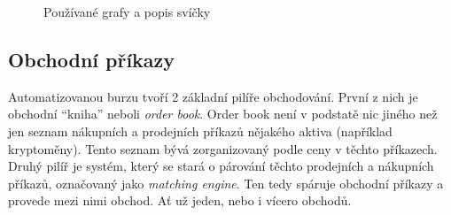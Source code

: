 \begin{figure}[ht]
    \centering
    \qquad

    \qquad

    \caption{Používané grafy a popis svíčky}
    \label{fig:most-used-charts}
\end{figure}


\subsection{Obchodní příkazy}
\label{subsec:market-trade-orders}
Automatizovanou burzu tvoří 2 základní pilíře obchodování. První z nich je obchodní \enquote{kniha} neboli \emph{order book}. Order book není v podstatě nic
jiného než jen seznam nákupních a prodejních příkazů nějakého aktiva (například kryptoměny). Tento seznam bývá zorganizovaný podle ceny v těchto příkazech.
Druhý pilíř je systém, který se stará o párování těchto prodejních a nákupních příkazů, označovaný jako \emph{matching engine}. Ten tedy spáruje obchodní příkazy
a provede mezi nimi obchod. Ať už jeden, nebo i vícero obchodů.

